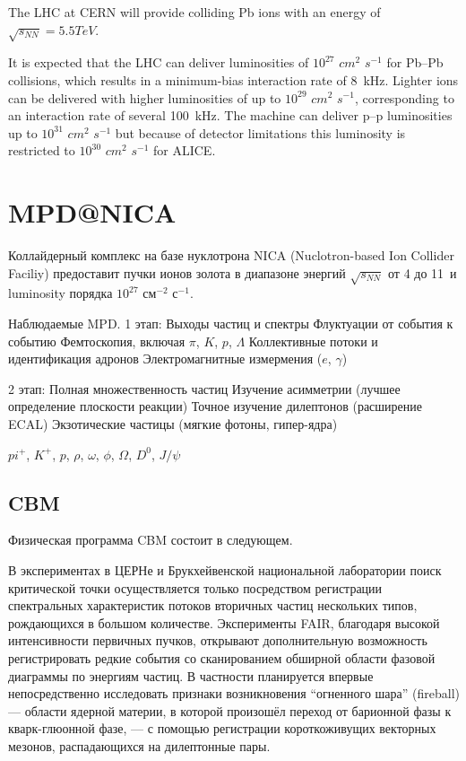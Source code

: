 The LHC at CERN will provide colliding Pb ions with an energy of $\sqrt{s_{NN}}=5.5 TeV$.

It is expected that the LHC can deliver luminosities of $10^{27}$ $cm^{2}$ $s^{-1}$ for Pb--Pb collisions, which results in a minimum-bias interaction rate of 8~kHz. Lighter ions can be delivered with higher luminosities of up to $10^{29}$ $cm^{2}$ $s^{-1}$, corresponding to an interaction rate of several 100~kHz. The machine can deliver p--p luminosities up to $10^{31}$ $cm^{2}$ $s^{-1}$ but because of detector limitations this luminosity is restricted to $10^{30}$ $cm^{2}$ $s^{-1}$ for ALICE.

\section{MPD@NICA}

Коллайдерный комплекс на базе нуклотрона NICA (Nuclotron-based Ion Collider Faciliy) предоставит пучки ионов золота в диапазоне энергий $\sqrt{s_{NN}}$ от 4 до 11~\GeV и luminosity порядка $10^{27}$ см$^{-2}$ с$^{-1}$.



Наблюдаемые MPD.
1 этап:
Выходы частиц и спектры
Флуктуации от события к событию
Фемтоскопия, включая $\pi$, $K$, $p$, $\Lambda$
Коллективные потоки и идентификация адронов
Электромагнитные измермения ($e$, $\gamma$)

2 этап:
Полная множественность частиц
Изучение асимметрии (лучшее определение плоскости реакции)
Точное изучение дилептонов (расширение ECAL)
Экзотические частицы (мягкие фотоны, гипер-ядра)


$pi^{+}$, $K^{+}$, $p$, $\rho$, $\omega$, $\phi$, $\Omega$, $D^{0}$, $J/\psi$




\subsection{CBM}

Физическая программа CBM состоит в следующем.

В экспериментах в ЦЕРНе и Брукхейвенской национальной лаборатории поиск критической точки осуществляется только посредством регистрации спектральных характеристик потоков вторичных частиц нескольких типов, рождающихся в большом количестве. Эксперименты FAIR, благодаря высокой интенсивности первичных пучков, открывают дополнительную возможность регистрировать редкие события со сканированием обширной области фазовой диаграммы по энергиям частиц. В частности планируется впервые непосредственно исследовать признаки возникновения ``огненного шара'' (fireball) --- области ядерной материи, в которой произошёл переход от барионной фазы к кварк-глюонной фазе, --- с помощью регистрации короткоживущих векторных мезонов, распадающихся на дилептонные пары.

